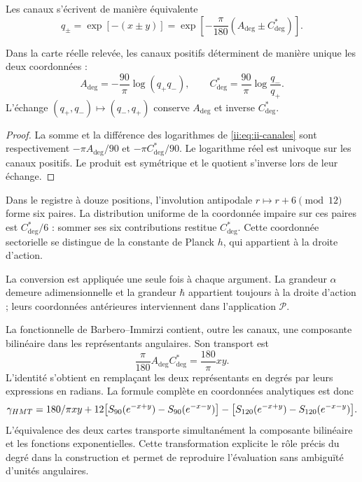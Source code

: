 Les canaux s'écrivent de manière équivalente
\begin{equation}
 q_\pm=\exp[-(x\pm y)]
 =\exp\!\left[-\frac{\pi}{180}(A_{\deg}\pm C^*_{\deg})\right].
\label{ii:eq:ii-canales}
\end{equation}
\begin{proposition}
\label{ii:prop:ii-inversion-canales-angulares}
Dans la carte réelle relevée, les canaux positifs déterminent
de manière unique les deux coordonnées :
\[
 A_{\deg}=-\frac{90}{\pi}\log(q_+q_-),\qquad
 C^*_{\deg}=\frac{90}{\pi}\log\frac{q_-}{q_+}.
\]
L'échange \((q_+,q_-)\mapsto(q_-,q_+)\) conserve
\(A_{\deg}\) et inverse \(C^*_{\deg}\).
\end{proposition}
\begin{proof}
La somme et la différence des logarithmes de
\eqref{ii:eq:ii-canales} sont respectivement
\(-\pi A_{\deg}/90\) et \(-\pi C^*_{\deg}/90\).
Le logarithme réel est univoque sur les canaux positifs.
Le produit est symétrique et le quotient s'inverse lors de leur échange.
\end{proof}
Dans le registre à douze positions, l'involution antipodale
\(r\mapsto r+6\pmod {12}\) forme six paires. La distribution
uniforme de la coordonnée impaire sur ces paires est
\(C^*_{\deg}/6\) : sommer ses six contributions restitue
\(C^*_{\deg}\). Cette coordonnée sectorielle se distingue de
la constante de Planck \(h\), qui appartient à la droite d'action.

La conversion est appliquée une seule fois à chaque argument. La grandeur
\(\alpha\) demeure adimensionnelle et la grandeur \(\hbar\)
appartient toujours à la droite d'action ; leurs coordonnées antérieures
interviennent dans l'application \(\mathcal P\).

La fonctionnelle de Barbero--Immirzi contient, outre les canaux, une
composante bilinéaire dans les représentants angulaires. Son transport est
\begin{equation}
 \frac{\pi}{180}A_{\deg}C^*_{\deg}
 =\frac{180}{\pi}xy.
 \label{ii:eq:ii-barbero-cartas}
\end{equation}
L'identité s'obtient en remplaçant les deux représentants en degrés
par leurs expressions en radians. La formule complète en
coordonnées analytiques est donc
\[
 \gamma_{HMT}
 =180/\pi xy
 +12\bigl[S_{90}(e^{-x+y})-S_{90}(e^{-x-y})\bigr]
 -\bigl[S_{120}(e^{-x+y})-S_{120}(e^{-x-y})\bigr].
\]
L'équivalence des deux cartes transporte simultanément la composante bilinéaire
et les fonctions exponentielles. Cette transformation
explicite le rôle précis du degré dans la construction et permet de
reproduire l'évaluation sans ambiguïté d'unités angulaires.
